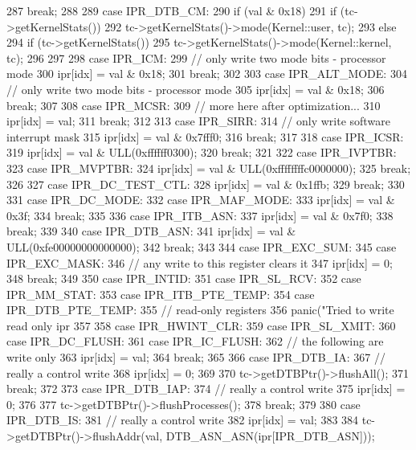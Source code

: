 \begin{DoxyCode}
{{287         break;
288 
289       case IPR_DTB_CM:
290         if (val & 0x18) {
291             if (tc->getKernelStats())
292                 tc->getKernelStats()->mode(Kernel::user, tc);
293         } else {
294             if (tc->getKernelStats())
295                 tc->getKernelStats()->mode(Kernel::kernel, tc);
296         }
297 
298       case IPR_ICM:
299         // only write two mode bits - processor mode
300         ipr[idx] = val & 0x18;
301         break;
302 
303       case IPR_ALT_MODE:
304         // only write two mode bits - processor mode
305         ipr[idx] = val & 0x18;
306         break;
307 
308       case IPR_MCSR:
309         // more here after optimization...
310         ipr[idx] = val;
311         break;
312 
313       case IPR_SIRR:
314         // only write software interrupt mask
315         ipr[idx] = val & 0x7fff0;
316         break;
317 
318       case IPR_ICSR:
319         ipr[idx] = val & ULL(0xffffff0300);
320         break;
321 
322       case IPR_IVPTBR:
323       case IPR_MVPTBR:
324         ipr[idx] = val & ULL(0xffffffffc0000000);
325         break;
326 
327       case IPR_DC_TEST_CTL:
328         ipr[idx] = val & 0x1ffb;
329         break;
330 
331       case IPR_DC_MODE:
332       case IPR_MAF_MODE:
333         ipr[idx] = val & 0x3f;
334         break;
335 
336       case IPR_ITB_ASN:
337         ipr[idx] = val & 0x7f0;
338         break;
339 
340       case IPR_DTB_ASN:
341         ipr[idx] = val & ULL(0xfe00000000000000);
342         break;
343 
344       case IPR_EXC_SUM:
345       case IPR_EXC_MASK:
346         // any write to this register clears it
347         ipr[idx] = 0;
348         break;
349 
350       case IPR_INTID:
351       case IPR_SL_RCV:
352       case IPR_MM_STAT:
353       case IPR_ITB_PTE_TEMP:
354       case IPR_DTB_PTE_TEMP:
355         // read-only registers
356         panic("Tried to write read only ipr %
357 
358       case IPR_HWINT_CLR:
359       case IPR_SL_XMIT:
360       case IPR_DC_FLUSH:
361       case IPR_IC_FLUSH:
362         // the following are write only
363         ipr[idx] = val;
364         break;
365 
366       case IPR_DTB_IA:
367         // really a control write
368         ipr[idx] = 0;
369 
370         tc->getDTBPtr()->flushAll();
371         break;
372 
373       case IPR_DTB_IAP:
374         // really a control write
375         ipr[idx] = 0;
376 
377         tc->getDTBPtr()->flushProcesses();
378         break;
379 
380       case IPR_DTB_IS:
381         // really a control write
382         ipr[idx] = val;
383 
384         tc->getDTBPtr()->flushAddr(val, DTB_ASN_ASN(ipr[IPR_DTB_ASN]));
}}
\end{DoxyCode}
